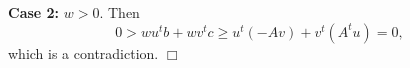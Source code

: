 \documentclass[12pt, showidx, twoside]{article}
\def\prove{\par \noindent \hbox{\bf Proof:}\quad}
\def\endproof{\hfill{$\Box$}}
\def\R{\mathbb{R}}
\begin{document}
{{{{{\bf Case 2:} $w > 0$.
Then
\[
   0 > w u^t b + w v^t c \geq u^t (-A v) + v^t (A^t u) = 0,
\]
which is a contradiction.
\endproof







}}}}
\end{document}
